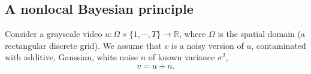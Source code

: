 \documentclass[10pt, a4paper]{article}
\newcommand{\ma}[1]{\boldsymbol{#1}}
\newcommand{\ie}{\emph{i.e}. } \newcommand{\Ie}{\emph{I.e}. }
\begin{document}
%



\subsection{A nonlocal Bayesian principle}

Consider a grayscale video $u:\Omega\times \{1,\cdots,T\}\rightarrow
\mathbb R$, where $\Omega$ is the spatial domain (a rectangular discrete grid).
We assume that $v$ is a noisy version of $u$, contaminated with additive,
Gaussian, white noise $n$ of known variance $\sigma^2$,
\[v = u + n.\]
\end{document}
